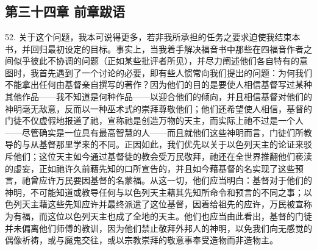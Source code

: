 

\section{}


\subsection{第三十四章 前章跋语}

52. 关于这个问题，我本可说得更多，若非我所承担的任务之要求迫使我结束本书，并回归最初设定的目标。事实上，当我着手解决福音书中那些在四福音作者之间似乎彼此不协调的问题（正如某些批评者所见），并尽力阐述他们各自特有的意图时，我首先遇到了一个讨论的必要，即有些人惯常向我们提出的问题：为何我们不能拿出任何由基督亲自撰写的著作？因为他们的目的是要使人相信基督写过某种其他作品——我不知道是何种作品——以迎合他们的倾向，并且相信基督对他们的神明毫无敌意，反而以一种巫术式的崇拜尊敬他们；他们还希望使人相信，基督的门徒不仅虚假地报道了祂，宣称祂是创造万物的天主，而实际上祂不过是一个人——尽管确实是一位具有最高智慧的人——而且就他们这些神明而言，门徒们所教导的与从基督那里学来的不同。正因如此，我们优先以关于以色列天主的论证来驳斥他们；这位天主如今通过基督徒的教会受万民敬拜，祂还在全世界推翻他们亵渎的虚妄，正如祂许久前藉先知的口所宣告的，并且如今藉基督的名实现了这些预言，祂曾应许万民要因基督的名蒙福。从这一切，他们应当明白：基督对于他们的神明，不可能知道或教导任何与以色列天主藉其先知所命令和预言的不同之事；以色列天主藉这些先知应许并最终派遣了这位基督，因着给祖先的应许，万民被宣称为有福，而这位以色列天主也成了全地的天主。他们也应当由此看出，基督的门徒并未偏离他们师傅的教训，因为他们禁止敬拜外邦人的神明，以免我们向无感觉的偶像祈祷，或与魔鬼交往，或以宗教崇拜的敬意事奉受造物而非造物主。\par


